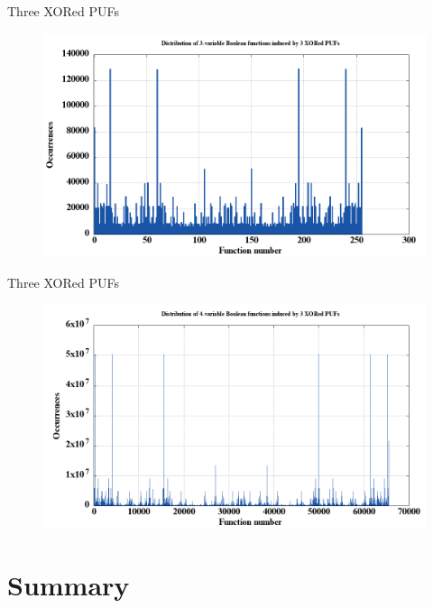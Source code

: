 \documentclass[10pt, compress]{beamer}
\begin{document}
\begin{frame}{Three XORed PUFs}
    \begin{figure}
        \centering
        \includegraphics[width=\textwidth]{figures/dist/distribution_of_3-variable_boolean_functions_induced_by_3_xored_pufs.png}
    \end{figure}
\end{frame}

\begin{frame}{Three XORed PUFs}
    \begin{figure}
        \centering
        \includegraphics[width=\textwidth]{figures/dist/distribution_of_4-variable_boolean_functions_induced_by_3_xored_pufs.png}
    \end{figure}
\end{frame}

\section{Summary}
\end{document}
